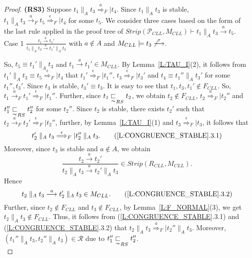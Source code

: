 \documentclass{elsarticle}
\theoremstyle{plain}
\theoremstyle{definition}
\begin{document}
\begin{proof}
\textbf{(RS3)} Suppose $ t_1 \parallel_A t_3  \stackrel{a}{\Longrightarrow}_F|t_4$.
    Since $t_1 \parallel_A t_3 $ is stable, $t_1 \parallel_A t_3 \stackrel{a}{\longrightarrow}_F t_5 \stackrel{\epsilon}{\Longrightarrow}_F|t_4$ for some $t_5$.
    We consider three cases based on the form of the last rule applied in the proof tree of $Strip({\mathcal P}_{CLL},M_{{CLL}}) \vdash t_1 \parallel_A t_3 \stackrel{a}{\longrightarrow} t_5$.\\

 \noindent   Case 1 $\frac{t_1 \stackrel{a}{\longrightarrow} t_1'}{t_1 \parallel_A t_3 \stackrel{a}{\longrightarrow} t_1'\parallel_A t_3}$ with $a\notin A$ and $M_{{CLL}} \models t_3 \not\stackrel{\tau}{\longrightarrow}$.

    So, $t_5 \equiv t_1'\parallel_A t_3$ and $t_1 \stackrel{a}{\longrightarrow} t_1' \in M_{{CLL}}$.
    By Lemma~\ref{L:TAU_I}(2), it follows from $t_1'\parallel_A t_3 \equiv t_5 \stackrel{\epsilon}{\Longrightarrow}_F|t_4$ that     $t_1' \stackrel{\epsilon}{\Longrightarrow}_F|t_1''$, $t_3 \stackrel{\epsilon}{\Longrightarrow}_F|t_3'$ and $t_4 \equiv t_1''\parallel_A t_3'$ for some $t_1'',t_3'$.
    Since $t_3$ is stable,  $t_3' \equiv t_3$.
    It is easy to see that $t_1,t_3,t_1' \notin F_{{CLL}}$.
    So, $t_1 \stackrel{a}{\longrightarrow}_F t_1' \stackrel{\epsilon}{\Longrightarrow}_F|t_1''$.
    Further, since $t_1 \underset{\thicksim}{\sqsubset}_{RS} t_2$, we obtain $t_2 \notin  F_{{CLL}}$,  $t_2 \stackrel{a}{\Longrightarrow}_F|t_2''$  and $t_1'' \underset{\thicksim}{\sqsubset}_{RS} t_2''$ for some $t_2''$.
    Since $t_2$ is stable, there exists $t_2'$ such that $t_2 \stackrel{a}{\longrightarrow}_F t_2' \stackrel{\epsilon}{\Longrightarrow}_F|t_2''$,
    further, by Lemma~\ref{L:TAU_I}(1) and $t_3 \stackrel{\epsilon}{\Longrightarrow}_F|t_3$, it follows that
    \[t_2' \parallel_A t_3\stackrel{\epsilon}{\Longrightarrow}_F|t_2'' \parallel_A t_3.\tag{\ref{L:CONGRUENCE_STABLE}.3.1}\]
    Moreover, since $t_3$ is stable and $a\notin A$, we obtain
    \[\frac{t_2 \stackrel{a}{\longrightarrow} t_2'}{t_2 \parallel_A t_3 \stackrel{a}{\longrightarrow} t_2'\parallel_A t_3} \in Strip(R_{CLL},M_{{CLL}}).\]
    Hence
    \[t_2 \parallel_A t_3 \stackrel{a}{\longrightarrow} t_2'\parallel_A t_3 \in M_{{CLL}}. \tag{\ref{L:CONGRUENCE_STABLE}.3.2}\]
    Further, since $t_2 \notin  F_{{CLL}}$ and $ t_3 \notin  F_{{CLL}}$, by Lemma~\ref{L:F_NORMAL}(3), we get $t_2 \parallel_A t_3 \notin  F_{{CLL}}$.
    Thus, it follows from (\ref{L:CONGRUENCE_STABLE}.3.1) and (\ref{L:CONGRUENCE_STABLE}.3.2) that
    $t_2 \parallel_A t_3 \stackrel{a}{\Longrightarrow}_F| t_2'' \parallel_A t_3$.
    Moreover, $(t_1 ''\parallel_A t_3,t_2''\parallel_A t_3) \in {\mathcal R}$ due to $t_1'' \underset{\thicksim}{\sqsubset}_{RS} t_2''$.\\


\end{proof}
\end{document}
